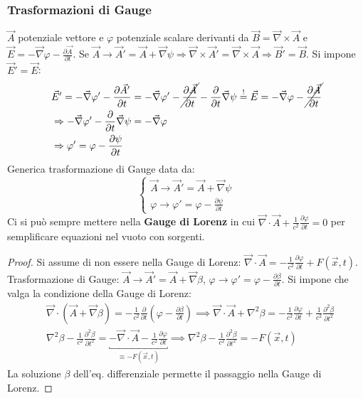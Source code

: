 \documentclass[a4paper]{scrartcl}
\numberwithin{equation}{subsection}
\theoremstyle{style1}
\newenvironment{boxenv}[1][]{
    \begin{eqbox}[#1]
    }{
   \end{eqbox}
}
\begin{document}
\subsubsection{Trasformazioni di Gauge}

$\vec{A}$ potenziale vettore e $\varphi $ potenziale scalare derivanti da $\vec{B}= \vec{\nabla }\times \vec{A}$ e $\vec{E}=-\vec{\nabla }\varphi  - \frac{\partial \vec{A}}{\partial t}$. Se $\vec{A}\to \vec{A}' = \vec{A}+\vec{\nabla }\psi \Rightarrow \vec{\nabla }\times \vec{A}' = \vec{\nabla }\times \vec{A}\Rightarrow \vec{B}' = \vec{B}$. Si impone $\vec{E}' = \vec{E}$:
\[
\begin{split}
	&\vec{E}' = - \vec{\nabla }\varphi ' - \frac{\partial \vec{A}'}{\partial t} = - \vec{\nabla }\varphi ' - \cancel{\frac{\partial \vec{A}}{\partial t} } - \frac{\partial }{\partial t} \vec{\nabla }\psi \stackrel{!}{=}\vec{E}= - \vec{\nabla }\varphi  - \cancel{\frac{\partial \vec{A}}{\partial t} }\\
	&\Rightarrow -\vec{\nabla }\varphi ' - \frac{\partial }{\partial t} \vec{\nabla }\psi  = - \vec{\nabla }\varphi \\
	&\Rightarrow \varphi ' = \varphi  - \frac{\partial \psi }{\partial t} 
\end{split}
\] 
Generica trasformazione di Gauge data da:
\begin{equation}
	\begin{cases}
		\vec{A}\to \vec{A}' = \vec{A} + \vec{\nabla }\psi \\
		 \varphi \to \varphi ' = \varphi  - \frac{\partial \psi }{\partial t} 
	\end{cases}
\end{equation}
Ci si pu\`o sempre mettere nella \textbf{Gauge di Lorenz} in cui $\vec{\nabla }\cdot \vec{A}+\frac{1}{c^2}\frac{\partial \varphi }{\partial t} = 0$ per semplificare equazioni nel vuoto con sorgenti.
\begin{boxenv}[]
\begin{proof}
	Si assume di non essere nella Gauge di Lorenz: $\vec{\nabla }\cdot \vec{A}=-\frac{1}{c^2}\frac{\partial \varphi }{\partial t} + F (\vec{x},t)$. Trasformazione di Gauge: $\vec{A}\to \vec{A}' = \vec{A} + \vec{\nabla }\beta $, $\varphi \to \varphi ' = \varphi  - \frac{\partial \beta }{\partial t}$. Si impone che valga la condizione della Gauge di Lorenz:
	\[
	\begin{split}
		&\vec{\nabla }\cdot (\vec{A}+\vec{\nabla }\beta ) = -\frac{1}{c^2}\frac{\partial }{\partial t} \left(\varphi  - \frac{\partial \beta }{\partial t} \right) \implies \vec{\nabla }\cdot \vec{A}+\nabla ^2 \beta =-\frac{1}{c^2}\frac{\partial \varphi }{\partial t}+\frac{1}{c^2}\frac{\partial ^2 \beta }{\partial t^2}\\
		&\nabla ^2 \beta  - \frac{1}{c^2} \frac{\partial ^2\beta }{\partial t^2}  = \underbracket{- \vec{\nabla }\cdot \vec{A} - \frac{1}{c^2} \frac{\partial \varphi }{\partial t} }_{\equiv - F(\vec{x},t)} \implies \nabla ^2 \beta  - \frac{1}{c^2}\frac{\partial ^2\beta }{\partial t^2} = - F(\vec{x},t)
	\end{split}
	\] 
	La soluzione $\beta $ dell'eq. differenziale permette il passaggio nella Gauge di Lorenz.
\end{proof}
\end{boxenv}
\end{document}
